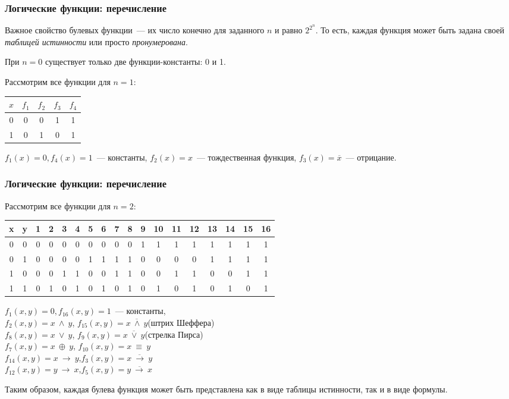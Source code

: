 \begin{frame}
\frametitle{Логические функции: перечисление}

Важное свойство булевых функции~--- их число конечно для заданного $n$ и равно
$2^{2^n}$. То есть, каждая функция может быть задана своей \emph{таблицей истинности} или просто
\emph{пронумерована}.  

При $n = 0$ существует только две функции-константы: 0 и 1.

Рассмотрим все функции для $n = 1$:

\begin{center}
  \begin{tabular}{|c|c|c|c|c|}
    \hline
    $x$ & $f_1$ & $f_2$ & $f_3$ & $f_4$\\ \hline
    0 & 0 & 0 & 1 & 1\\ \hline
    1 & 0 & 1 & 0 & 1\\ \hline
  \end{tabular}
\end{center}

$f_1(x) = 0, f_4(x) = 1$~--- константы, $f_2(x) = x$~--- тождественная функция, $f_3(x) =
\overline{x}$~--- отрицание.
\end{frame}

\begin{frame}
\frametitle{Логические функции: перечисление}
Рассмотрим все функции для $n = 2$: \\ \scriptsize
  \begin{tabular}{|c|c|c|c|c|c|c|c|c|c|c|c|c|c|c|c|c|c|}
    \hline
    x & y & 1 & 2 & 3 & 4 & 5 & 6 & 7 & 8 & 9 & 10 & 11 & 12 & 13 & 14 & 15 & 16\\ \hline
    0 & 0 & 0 & 0 & 0 & 0 & 0 & 0 & 0 & 0 & 1 & 1 & 1 & 1 & 1 & 1 & 1 & 1\\ \hline
    0 & 1 & 0 & 0 & 0 & 0 & 1 & 1 & 1 & 1 & 0 & 0 & 0 & 0 & 1 & 1 & 1 & 1\\ \hline
    1 & 0 & 0 & 0 & 1 & 1 & 0 & 0 & 1 & 1 & 0 & 0 & 1 & 1 & 0 & 0 & 1 & 1\\ \hline
    1 & 1 & 0 & 1 & 0 & 1 & 0 & 1 & 0 & 1 & 0 & 1 & 0 & 1 & 0 & 1 & 0 & 1\\ \hline
  \end{tabular}
\normalsize
$f_1(x, y) = 0, f_{16}(x, y) = 1$~--- константы, \\ \pause
$f_2(x, y) =x~\wedge~y$, $f_{15}(x, y) =\overline{x~\wedge~y}$(штрих Шеффера)  \\\pause
$f_8(x, y) = x~\vee~y$, $f_9(x, y) = \overline{x~\vee~y}$(стрелка Пирса)\\\pause
$f_7(x, y) = x~\oplus~y$, $f_{10}(x, y) = x~\equiv~y$\\\pause
$f_{14}(x, y) =x~\rightarrow~y$,$f_{3}(x, y) =\overline{x~\rightarrow~y}$  \\ \pause
$f_{12}(x, y) =y~\rightarrow~x$,$f_{5}(x, y) =\overline{y~\rightarrow~x}$  \\ \pause

Таким образом, каждая булева функция может быть представлена как в виде таблицы истинности,
так и в виде формулы. 

\end{frame}

